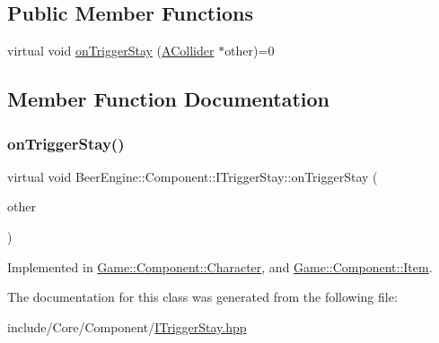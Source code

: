 \subsection*{Public Member Functions}
\begin{DoxyCompactItemize}
\item 
virtual void \mbox{\hyperlink{class_beer_engine_1_1_component_1_1_i_trigger_stay_ae0b762108ab5484071657e13f7a2cbd7}{on\+Trigger\+Stay}} (\mbox{\hyperlink{class_beer_engine_1_1_component_1_1_a_collider}{A\+Collider}} $\ast$other)=0
\end{DoxyCompactItemize}


\subsection{Member Function Documentation}
\mbox{\label{class_beer_engine_1_1_component_1_1_i_trigger_stay_ae0b762108ab5484071657e13f7a2cbd7}} 
\subsubsection{\texorpdfstring{on\+Trigger\+Stay()}{onTriggerStay()}}
{\footnotesize\ttfamily virtual void Beer\+Engine\+::\+Component\+::\+I\+Trigger\+Stay\+::on\+Trigger\+Stay (\begin{DoxyParamCaption}\item[{\mbox{\hyperlink{class_beer_engine_1_1_component_1_1_a_collider}{A\+Collider}} $\ast$}]{other }\end{DoxyParamCaption})\hspace{0.3cm}{\ttfamily [pure virtual]}}



Implemented in \mbox{\hyperlink{class_game_1_1_component_1_1_character_ab0ac4d77a9403cded5c52d77121a625c}{Game\+::\+Component\+::\+Character}}, and \mbox{\hyperlink{class_game_1_1_component_1_1_item_a02230f3771a83e4a77035cb0ec4c04be}{Game\+::\+Component\+::\+Item}}.



The documentation for this class was generated from the following file\+:\begin{DoxyCompactItemize}
\item 
include/\+Core/\+Component/\mbox{\hyperlink{_i_trigger_stay_8hpp}{I\+Trigger\+Stay.\+hpp}}\end{DoxyCompactItemize}
